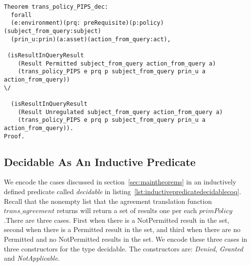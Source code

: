 \begin{lstlisting}
Theorem trans_policy_PIPS_dec:
  forall
  (e:environment)(prq: preRequisite)(p:policy)(subject_from_query:subject)
  (prin_u:prin)(a:asset)(action_from_query:act),

 (isResultInQueryResult
    (Result Permitted subject_from_query action_from_query a)
    (trans_policy_PIPS e prq p subject_from_query prin_u a action_from_query))
\/

  (isResultInQueryResult
    (Result Unregulated subject_from_query action_from_query a)
    (trans_policy_PIPS e prq p subject_from_query prin_u a action_from_query)).
Proof.

\end{lstlisting}
\subsection{Decidable As An Inductive Predicate}

We encode the cases discussed in section~\ref{sec:maintheorems} in an inductively defined predicate called \emph{decidable} in listing~\ref{lst:inductivepredicatedecidablecoq}. Recall that the nonempty list that the agreement translation function $trans\_agreement$ returns will return a set of results one per each $primPolicy$.There are three cases. First when there is a NotPermitted result in the set, second when there is a Permitted result in the set, and third when there are no Permitted and no NotPermitted results in the set. We encode these three cases in three constructors for the type decidable. The constructors are: \emph{Denied}, \emph{Granted} and \emph{NotApplicable}.

